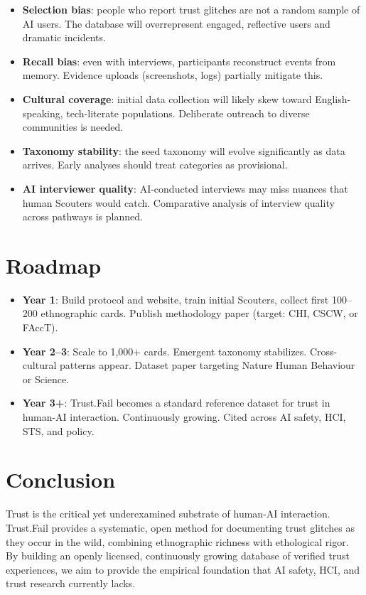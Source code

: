\documentclass[11pt,a4paper]{article}
\begin{document}
\begin{itemize}[noitemsep]
    \item \textbf{Selection bias}: people who report trust glitches are not a random sample of AI users. The database will overrepresent engaged, reflective users and dramatic incidents.
    \item \textbf{Recall bias}: even with interviews, participants reconstruct events from memory. Evidence uploads (screenshots, logs) partially mitigate this.
    \item \textbf{Cultural coverage}: initial data collection will likely skew toward English-speaking, tech-literate populations. Deliberate outreach to diverse communities is needed.
    \item \textbf{Taxonomy stability}: the seed taxonomy will evolve significantly as data arrives. Early analyses should treat categories as provisional.
    \item \textbf{AI interviewer quality}: AI-conducted interviews may miss nuances that human Scouters would catch. Comparative analysis of interview quality across pathways is planned.
\end{itemize}

\section{Roadmap}

\begin{itemize}[noitemsep]
    \item \textbf{Year 1}: Build protocol and website, train initial Scouters, collect first 100--200 ethnographic cards. Publish methodology paper (target: CHI, CSCW, or FAccT).
    \item \textbf{Year 2--3}: Scale to 1,000+ cards. Emergent taxonomy stabilizes. Cross-cultural patterns appear. Dataset paper targeting Nature Human Behaviour or Science.
    \item \textbf{Year 3+}: Trust.Fail becomes a standard reference dataset for trust in human-AI interaction. Continuously growing. Cited across AI safety, HCI, STS, and policy.
\end{itemize}

\section{Conclusion}

Trust is the critical yet underexamined substrate of human-AI interaction. Trust.Fail provides a systematic, open method for documenting trust glitches as they occur in the wild, combining ethnographic richness with ethological rigor. By building an openly licensed, continuously growing database of verified trust experiences, we aim to provide the empirical foundation that AI safety, HCI, and trust research currently lacks.
\end{document}
